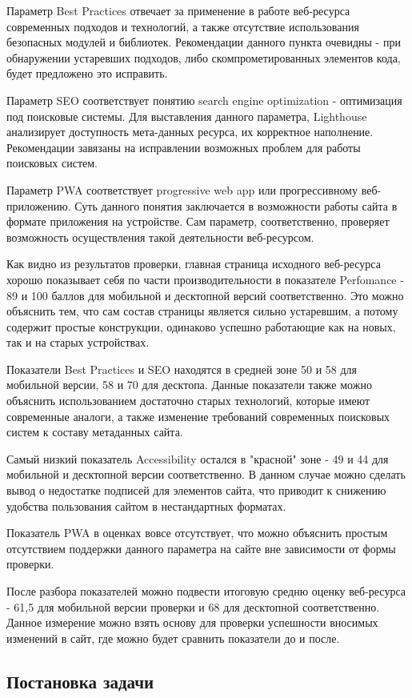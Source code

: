 Параметр Best Practices отвечает за применение в работе веб-ресурса современных подходов и технологий, а также отсутствие использования безопасных модулей и библиотек.
Рекомендации данного пункта очевидны - при обнаружении устаревших подходов, либо скомпрометированных элементов кода, будет предложено это исправить.

Параметр SEO соответствует понятию search engine optimization - оптимизация под поисковые системы.
Для выставления данного параметра, Lighthouse анализирует доступность мета-данных ресурса, их корректное наполнение.
Рекомендации завязаны на исправлении возможных проблем для работы поисковых систем.

Параметр PWA соответствует progressive web app или прогрессивному веб-приложению.
Суть данного понятия заключается в возможности работы сайта в формате приложения на устройстве.
Сам параметр, соответственно, проверяет возможность осуществления такой деятельности веб-ресурсом.

Как видно из результатов проверки, главная страница исходного веб-ресурса хорошо показывает себя по части производительности в показателе Perfomance - 89 и 100 баллов для мобильной и десктопной версий соответственно.
Это можно объяснить тем, что сам состав страницы является сильно устаревшим, а потому содержит простые конструкции, одинаково успешно работающие как на новых, так и на старых устройствах.

Показатели Best Practices и SEO находятся в средней зоне 50 и 58 для мобильной версии, 58 и 70 для десктопа.
Данные показатели также можно объяснить использованием достаточно старых технологий, которые имеют современные аналоги, а также изменение требований современных поисковых систем к составу метаданных сайта.

Самый низкий показатель Accessibility остался в "красной" зоне - 49 и 44 для мобильной и десктопной версии соответственно.
В данном случае можно сделать вывод о недостатке подписей для элементов сайта, что приводит к снижению удобства пользования сайтом в нестандартных форматах.

Показатель PWA в оценках вовсе отсутствует, что можно объяснить простым отсутствием поддержки данного параметра на сайте вне зависимости от формы проверки.

После разбора показателей можно подвести итоговую средню оценку веб-ресурса - 61,5 для мобильной версии проверки и 68 для десктопной соответственно.
Данное измерение можно взять основу для проверки успешности вносимых изменений в сайт, где можно будет сравнить показатели до и после.




\subsection{Постановка задачи}



\clearpage
